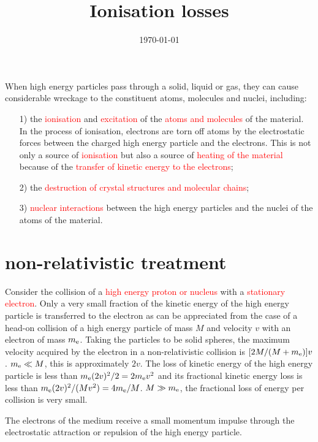 \documentclass[12pt,a4paper]{article}
\title{Ionisation losses}
\author{}
\date{\today}
\begin{document}
\maketitle

When high energy particles pass through a solid, liquid or gas, they can cause considerable wreckage to the constituent atoms, molecules and nuclei, including:
\begin{itemize}
\item[1)] the \textcolor{red}{ionisation} and \textcolor{red}{excitation} of the \textcolor{red}{atoms and molecules} of the material. In the process of ionisation, electrons are torn off atoms by the electrostatic forces between the charged high energy particle and the electrons. This is not only a source of \textcolor{red}{ionisation} but also a source of \textcolor{red}{heating of the material} because of the \textcolor{red}{transfer of kinetic energy to the electrons};
\item[2)] the \textcolor{red}{destruction of crystal structures and molecular chains};
\item[3)] \textcolor{red}{nuclear interactions} between the high energy particles and the nuclei of the atoms of the material.
\end{itemize}

\section{non-relativistic treatment}
Consider the collision of a \textcolor{red}{high energy proton or nucleus} with a \textcolor{red}{stationary electron}. Only a very small fraction of the kinetic energy of the high energy particle is transferred to the electron as can be appreciated from the case of a head-on collision of a high energy particle of mass $M$ and velocity $v$ with an electron of mass $m_{\rm e}$. Taking the particles to
be solid spheres, the maximum velocity acquired by the electron in a non-relativistic collision is $[2M/(M + m_{\rm e})]v$. $m_{\rm e}  \ll M$, this is approximately $2v$. The loss of kinetic energy of the high energy particle is less than $m_{\rm e} (2v)^2/2 = 2m_{\rm e}v^2$ and its fractional kinetic energy loss is less than $m_{\rm e} (2v)^2/(Mv^2) = 4m_{\rm e}/M$. $M \gg m_{\rm e}$, the fractional loss of energy per collision is very small. 

The electrons of the medium receive a small momentum impulse through the electrostatic attraction or repulsion of the high energy particle.
\end{document}
